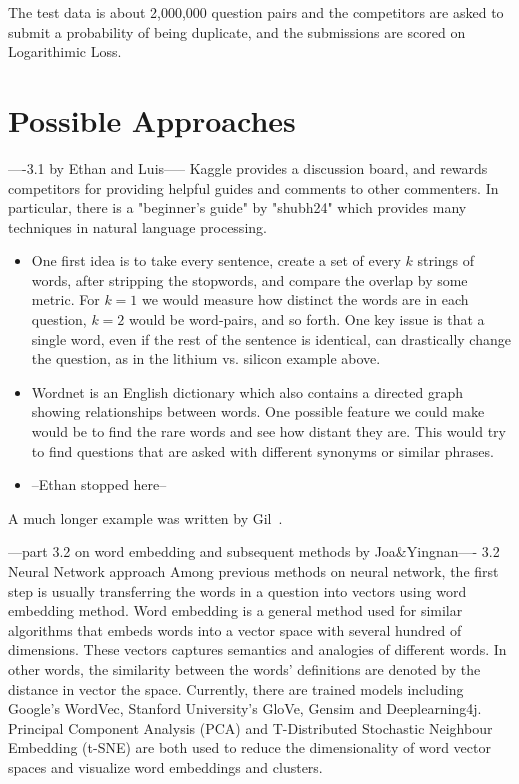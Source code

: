 \documentclass[12pt]{article}
\begin{document}
The test data is about 2,000,000 question pairs and the competitors are asked to submit a probability of being duplicate, and the submissions are scored on Logarithimic Loss.

\section{Possible Approaches}\label{approaches}
----3.1 by Ethan and Luis-----
Kaggle provides a discussion board, and rewards competitors for providing helpful guides and comments to other commenters. In particular, there is a "beginner's guide" by "shubh24" which provides many techniques in natural language processing.
\begin{itemize}
\item One first idea is to take every sentence, create a set of every $k$ strings of words, after stripping the stopwords, and compare the overlap by some metric. For $k=1$ we would measure how distinct the words are in each question, $k=2$ would be word-pairs, and so forth. One key issue is that a single word, even if the rest of the sentence is identical, can drastically change the question, as in the lithium vs. silicon example above.
\item Wordnet is an English dictionary which also contains a directed graph showing relationships between words. One possible feature we could make would be to find the rare words and see how distant they are. This would try to find questions that are asked with different synonyms or similar phrases.
\item --Ethan stopped here--
\end{itemize}

A much longer \LaTeXe{} example was written by Gil~\cite{Gil:02}.


---part 3.2 on word embedding and subsequent methods by Joa&Yingnan----
3.2 Neural Network approach
Among previous methods on neural network, the first step is usually transferring the words in a question into vectors using word embedding method. Word embedding is a general method used for similar algorithms that embeds words into a vector space with several hundred of dimensions. These vectors captures semantics and analogies of different words. In other words, the similarity between the words' definitions are denoted by the distance in vector the space. Currently, there are trained models including Google’s WordVec, Stanford University’s GloVe, Gensim and Deeplearning4j.  Principal Component Analysis (PCA) and T-Distributed Stochastic Neighbour Embedding (t-SNE) are both used to reduce the dimensionality of word vector spaces and visualize word embeddings and clusters.
\end{document}
